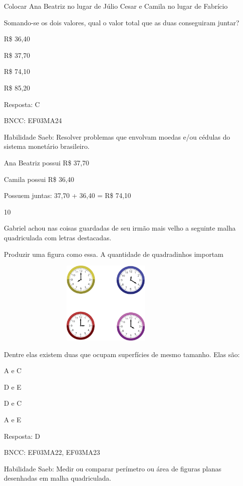 \begin{escolha}
Colocar Ana Beatriz no lugar de Júlio Cesar e Camila no lugar de
Fabrício

Somando-se os dois valores, qual o valor total que as duas conseguiram
juntar?

\begin{escolha}
\item
  R\$ 36,40
\item
  R\$ 37,70
\item
  R\$ 74,10
\item
  R\$ 85,20
\end{escolha}

Resposta: C

BNCC: EF03MA24

Habilidade Saeb: Resolver problemas que envolvam moedas e/ou cédulas do
sistema monetário brasileiro.

Ana Beatriz possui R\$ 37,70

Camila possui R\$ 36,40

Possuem juntas: 37,70 + 36,40 = R\$ 74,10

\num{10}

Gabriel achou nas coisas guardadas de seu irmão mais velho a seguinte
malha quadriculada com letras destacadas.

Produzir uma figura como essa. A quantidade de quadradinhos importam

\includegraphics[width=4.36538in,height=1.60417in]{media/image111.png}

Dentre elas existem duas que ocupam superfícies de mesmo tamanho. Elas
são:

\begin{escolha}
\item
  A e C
\item
  D e E
\item
  D e C
\item
  A e E
\end{escolha}

Resposta: D

BNCC: EF03MA22, EF03MA23

Habilidade Saeb: Medir ou comparar perímetro ou área de figuras planas
desenhadas em malha quadriculada.


\end{escolha}
